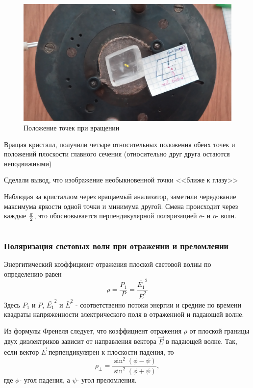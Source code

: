 \begin{figure}[H]
	\centering
	\includegraphics[width=\textwidth]{pic/dv.jpg}
	\caption{Положение точек при вращении}
	\label{fig:figure2}
\end{figure}

Вращая кристалл, получили четыре относительных положения обеих точек и положений плоскости главного сечения (относительно друг друга остаются неподвижными)

Сделали вывод, что изображение необыкновенной точки <<ближе к глазу>>

Наблюдая за кристаллом через вращаемый анализатор, заметили чередование максимума яркости одной точки и минимума другой. Смена происходит через каждые $\pi\over2$, это обосновывается перпендикулярной поляризацией e- и o- волн.
\part{}
\section{Поляризация световых волн при отражении и преломлении}
Энергитический коэффициент отражения плоской световой волны по определению равен
\begin{equation}
	\rho=\frac{P_1}{P}=\frac{\bar{E_1}^2}{\bar{E}^2}
\end{equation}
Здесь $P_1$ и $P$, $\bar{E_1}^2$ и $\bar{E}^2$ - соответственно потоки энергии и средние по времени квадраты напряженности электрического поля в отраженной и падающей волне.

Из формулы Френеля следует, что коэффициент отражения $\rho$ от плоской границы двух диэлектриков зависит от направления вектора $\vec{E}$ в падающей волне. Так, если вектор $\vec{E}$ перпендикулярен к плоскости падения, то 
\begin{equation}
\label{eq:2.1}
	\rho_{\bot}=\frac{\sin^2(\phi-\psi)}{\sin^2(\phi+\psi)},
\end{equation}
где $\phi$- угол падения, а $\psi$- угол преломления.

